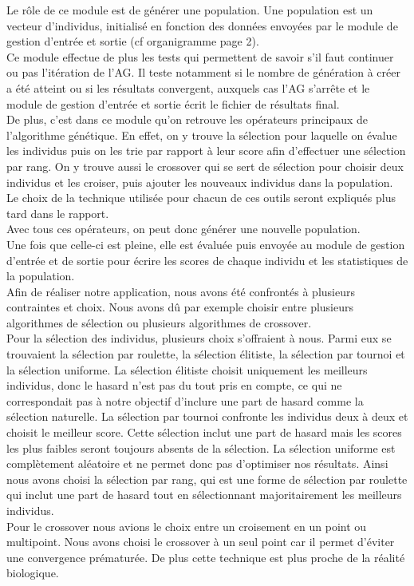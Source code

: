 \documentclass[a4paper,11pt]{article}
\begin{document}
			Le rôle de ce module est de générer une population.
			Une population est un vecteur d’individus, initialisé en fonction des données envoyées par le module de gestion d’entrée et sortie (cf organigramme page 2).\\
			Ce module effectue de plus les tests qui permettent de savoir s’il faut continuer ou pas l’itération de l’AG.
			Il teste notamment si le nombre de génération à créer a été atteint ou si les résultats convergent, auxquels cas l’AG s’arrête et le module de gestion d’entrée et sortie écrit le fichier de résultats final.\\
			De plus, c’est dans ce module qu’on retrouve les opérateurs principaux de l’algorithme génétique.
			En effet, on y trouve la sélection pour laquelle on évalue les individus puis on les trie par rapport à leur score afin d’effectuer une sélection par rang.
			On y trouve aussi le crossover qui se sert de sélection pour choisir deux individus et les croiser, puis ajouter les nouveaux individus dans la population.
			Le choix de la technique utilisée pour chacun de ces outils seront expliqués plus tard dans le rapport.\\
			Avec tous ces opérateurs, on peut donc générer une nouvelle population.\\
			Une fois que celle-ci est pleine, elle est évaluée puis envoyée au module de gestion d’entrée et de sortie pour écrire les scores de chaque individu et les statistiques de la population.\\

			Afin de réaliser notre application, nous avons été confrontés à plusieurs contraintes et choix. Nous avons dû par exemple choisir entre plusieurs algorithmes de sélection ou plusieurs algorithmes de crossover.\\
			Pour la sélection des individus, plusieurs choix s’offraient à nous. Parmi eux se trouvaient la sélection par roulette, la sélection élitiste, la sélection par tournoi et la sélection uniforme.
			La sélection élitiste choisit uniquement les meilleurs individus, donc le hasard n’est pas du tout pris en compte, ce qui ne correspondait pas à notre objectif d’inclure une part de hasard comme la sélection naturelle.
			La sélection par tournoi confronte les individus deux à deux et choisit le meilleur score.
			Cette sélection inclut une part de hasard mais les scores les plus faibles seront toujours absents de la sélection.
			La sélection uniforme est complètement aléatoire et ne permet donc pas d’optimiser nos résultats.
			Ainsi nous avons choisi la sélection par rang, qui est une forme de sélection par roulette qui inclut une part de hasard tout en sélectionnant majoritairement les meilleurs individus.\\
			Pour le crossover nous avions le choix entre un croisement en un point ou multipoint.
			Nous avons choisi le crossover à un seul point car il permet d’éviter une convergence prématurée. De plus cette technique est plus proche de la réalité biologique.
\end{document}
